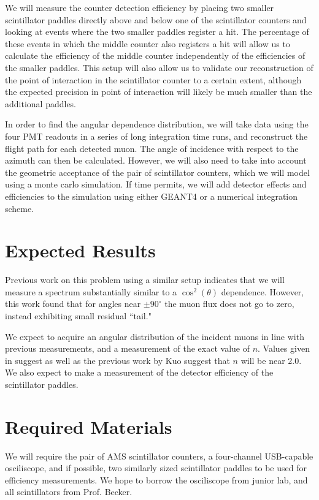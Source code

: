 We will measure the counter detection efficiency by placing two smaller scintillator paddles directly above and below one of the scintillator counters and looking at events where the two smaller paddles register a hit. The percentage of these events in which the middle counter also registers a hit will allow us to calculate the efficiency of the middle counter independently of the efficiencies of the smaller paddles. This setup will also allow us to validate our reconstruction of the point of interaction in the scintillator counter to a certain extent, although the expected precision in point of interaction will likely be much smaller than the additional paddles.

In order to find the angular dependence distribution, we will take data using the four PMT readouts in a series of long integration time runs, and reconstruct the flight path for each detected muon. The angle of incidence with respect to the azimuth can then be calculated. However, we will also need to take into account the geometric acceptance of the pair of scintillator counters, which we will model using a monte carlo simulation. If time permits, we will add detector effects and efficiencies to the simulation using either GEANT4 or a numerical integration scheme.

\section{Expected Results}

Previous work on this problem using a similar setup\cite{kuo} indicates that we will measure a spectrum substantially similar to a $\cos^2(\theta)$ dependence. However, this work found that for angles near $\pm90^\circ$ the muon flux does not go to zero, instead exhibiting small residual ``tail." 

We expect to acquire an angular distribution of the incident muons in line with previous measurements, and a measurement of the exact value of $n$. Values given in \cite{grieson} suggest as well as the previous work by Kuo \cite{kuo} suggest that $n$ will be near 2.0. We also expect to make a measurement of the detector efficiency of the scintillator paddles. 

\section{Required Materials}

We will require the pair of AMS scintillator counters, a four-channel USB-capable osciliscope, and if possible, two similarly sized scintillator paddles to be used for efficiency measurements. We hope to borrow the osciliscope from junior lab, and all scintillators from Prof. Becker.






